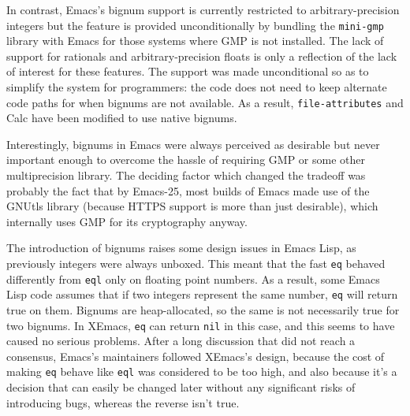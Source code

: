 \documentclass[format=acmsmall, review]{acmart}
\newcommand \Elisp {Emacs Lisp}
\begin{document}
In contrast, Emacs's bignum support is currently restricted to
arbitrary-precision integers but the feature is provided unconditionally by
bundling the \texttt{mini-gmp} library with Emacs for those systems where
GMP is not installed.  The lack of support for rationals and
arbitrary-precision floats is only a reflection of the lack of interest for
these features.  The support was made unconditional so as to simplify the
system for programmers: the code does
not need to keep alternate code paths for when bignums are not available.
As a result, \texttt{file-attributes} and Calc have been modified to use
native bignums.

Interestingly, bignums in Emacs were always perceived as desirable but never
important enough to overcome the hassle of requiring GMP or some other
multiprecision library.  The deciding factor which changed the tradeoff was probably the fact that by Emacs-25, most builds of Emacs made use of the GNUtls
library (because HTTPS support is more than just desirable), which
internally uses GMP for its cryptography anyway.

The introduction of bignums raises some design issues in \Elisp, as
previously integers were always unboxed.  This meant that the fast
\texttt{eq} behaved differently from \texttt{eql} only on floating point
numbers.  As a result, some \Elisp{} code assumes that if two integers
represent the same number, \texttt{eq} will return true on them.
Bignums are heap-allocated, so the same is not necessarily true for two
bignums.  In XEmacs, \texttt{eq} can return \texttt{nil} in this case, and
this seems to have caused no serious problems.  After a long discussion that
did not reach a consensus, Emacs's maintainers followed XEmacs's design,
because the cost of making \texttt{eq} behave like \texttt{eql} was
considered to be too high, and also because it's a decision that can easily
be changed later without any significant risks of introducing bugs, whereas
the reverse isn't true.




\end{document}
